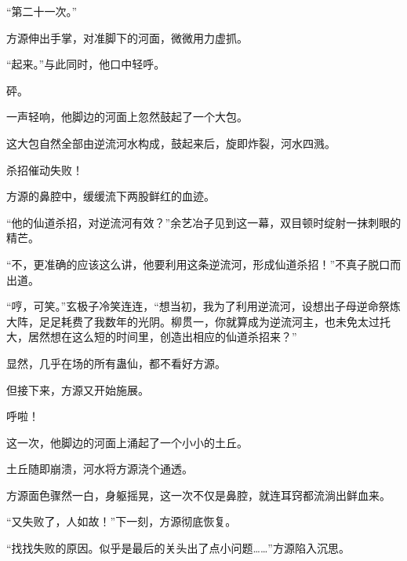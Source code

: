 \begin{this_body}
“第二十一次。”

方源伸出手掌，对准脚下的河面，微微用力虚抓。

“起来。”与此同时，他口中轻呼。

砰。

一声轻响，他脚边的河面上忽然鼓起了一个大包。

这大包自然全部由逆流河水构成，鼓起来后，旋即炸裂，河水四溅。

杀招催动失败！

方源的鼻腔中，缓缓流下两股鲜红的血迹。

“他的仙道杀招，对逆流河有效？”余艺冶子见到这一幕，双目顿时绽射一抹刺眼的精芒。

“不，更准确的应该这么讲，他要利用这条逆流河，形成仙道杀招！”不真子脱口而出道。

“哼，可笑。”玄极子冷笑连连，“想当初，我为了利用逆流河，设想出子母逆命祭炼大阵，足足耗费了我数年的光阴。柳贯一，你就算成为逆流河主，也未免太过托大，居然想在这么短的时间里，创造出相应的仙道杀招来？”

显然，几乎在场的所有蛊仙，都不看好方源。

但接下来，方源又开始施展。

呼啦！

这一次，他脚边的河面上涌起了一个小小的土丘。

土丘随即崩溃，河水将方源浇个通透。

方源面色骤然一白，身躯摇晃，这一次不仅是鼻腔，就连耳窍都流淌出鲜血来。

“又失败了，人如故！”下一刻，方源彻底恢复。

“找找失败的原因。似乎是最后的关头出了点小问题……”方源陷入沉思。

\end{this_body}


